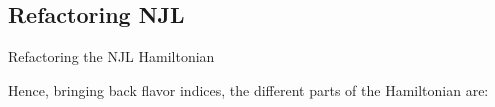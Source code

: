 
\subsection{Refactoring NJL}


\begin{frame}[allowframebreaks]{Refactoring the NJL Hamiltonian}



	Hence, bringing back flavor indices, the different parts of the Hamiltonian are:


\end{frame}
